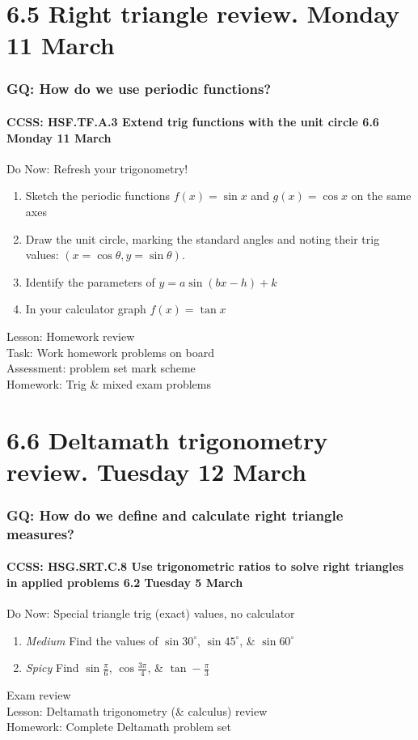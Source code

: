 \documentclass{beamer}
\begin{document}
\section{6.5 Right triangle review. Monday 11 March}
  \frame
  {
    \frametitle{GQ: How do we use periodic functions?}
    \framesubtitle{CCSS: HSF.TF.A.3 Extend trig functions with the unit circle  \hfill \alert{6.6 Monday 11 March}}

    \begin{block}{Do Now: Refresh your trigonometry!}
      \begin{enumerate}
      \item Sketch the periodic functions $f(x)=\sin{x}$ and $g(x)=\cos{x}$ on the same axes
      \item Draw the unit circle, marking the standard angles and noting their trig values: $(x=\cos{\theta}, y=\sin{\theta})$.
      \item Identify the parameters of $y=a\sin{(bx-h)}+k$
      \item In your calculator graph $f(x)=\tan{x}$
      \end{enumerate}
   \end{block}
    Lesson: Homework review\\[5pt]
    Task: Work homework problems on board\\%
    Assessment: problem set mark scheme\\%
    Homework: Trig \& mixed exam problems
  }

\section{6.6 Deltamath trigonometry review. Tuesday 12 March}
  \frame
  {
    \frametitle{GQ: How do we define and calculate right triangle measures?}
    \framesubtitle{CCSS: HSG.SRT.C.8 Use trigonometric ratios to solve right triangles in applied problems \hfill \alert{6.2 Tuesday 5 March}}

      \begin{block}{Do Now: Special triangle trig (exact) values, no calculator}
      \begin{enumerate}
          \item \emph{Medium} Find the values of $\sin 30^\circ$, $\sin 45^\circ$, \& $\sin 60^\circ$
          \item \emph{Spicy} Find $\sin \frac{\pi}{6}$, $\cos \frac{3\pi}{4}$, \& $\tan -\frac{\pi}{3}$
      \end{enumerate}
      \end{block}
    Exam review\\
    Lesson: Deltamath trigonometry (\& calculus) review\\
    Homework: Complete Deltamath problem set
  }
\end{document}

